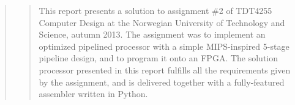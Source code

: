 \begin{quote}
\begin{quote}
This report presents a solution to assignment \#2 of TDT4255 Computer Design at the Norwegian University of Technology and Science, autumn 2013.
The assignment was to implement an optimized pipelined processor with a simple MIPS-inspired 5-stage pipeline design, and to program it onto an FPGA.
The solution processor presented in this report fulfills all the requirements given by the assignment, and is delivered together with a fully-featured assembler written in Python.
\end{quote}
\end{quote}
